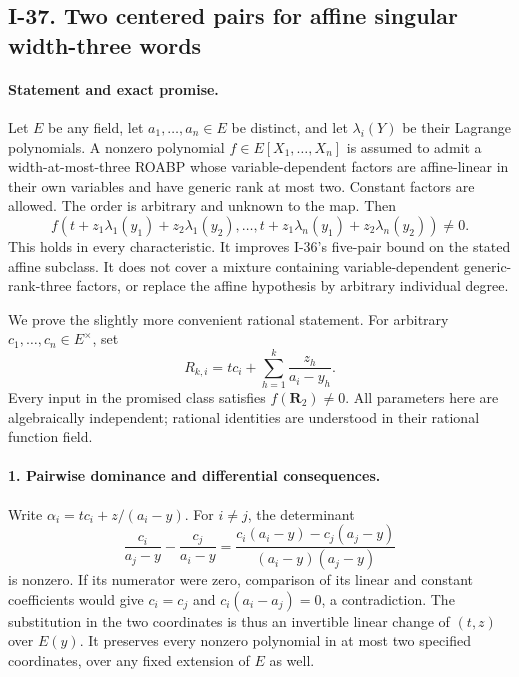 \subsection{I-37. Two centered pairs for affine singular width-three words}
\label{I-37}

\paragraph{Statement and exact promise.}
Let $E$ be any field, let $a_1,\ldots,a_n\in E$ be distinct, and let
$\lambda_i(Y)$ be their Lagrange polynomials. A nonzero polynomial
$f\in E[X_1,\ldots,X_n]$ is assumed to admit a width-at-most-three
ROABP whose variable-dependent factors are affine-linear in their
own variables and have generic rank at most two. Constant factors
are allowed. The order is arbitrary and unknown to the map. Then
\[
 f\left(t+z_1\lambda_1(y_1)+z_2\lambda_1(y_2),\ldots,
        t+z_1\lambda_n(y_1)+z_2\lambda_n(y_2)\right)\ne0.
 \tag{I.90}
\]
This holds in every characteristic. It improves I-36's five-pair
bound on the stated affine subclass. It does not cover a mixture
containing variable-dependent generic-rank-three factors, or
replace the affine hypothesis by arbitrary individual degree.

We prove the slightly more convenient rational statement. For
arbitrary $c_1,\ldots,c_n\in E^\times$, set
\[
 R_{k,i}=t c_i+\sum_{h=1}^{k}\frac{z_h}{a_i-y_h}.
 \tag{I.91}
\]
Every input in the promised class satisfies $f(\mathbf R_2)\ne0$.
All parameters here are algebraically independent; rational
identities are understood in their rational function field.

\paragraph{1. Pairwise dominance and differential consequences.}
Write $\alpha_i=t c_i+z/(a_i-y)$. For $i\ne j$, the determinant
\[
 \frac{c_i}{a_j-y}-\frac{c_j}{a_i-y}
 =\frac{c_i(a_i-y)-c_j(a_j-y)}{(a_i-y)(a_j-y)}
 \tag{I.92}
\]
is nonzero. If its numerator were zero, comparison of its linear
and constant coefficients would give $c_i=c_j$ and
$c_i(a_i-a_j)=0$, a contradiction. The substitution in the two
coordinates is thus an invertible linear change of $(t,z)$ over
$E(y)$. It preserves every nonzero polynomial in at most two
specified coordinates, over any fixed extension of $E$ as well.

